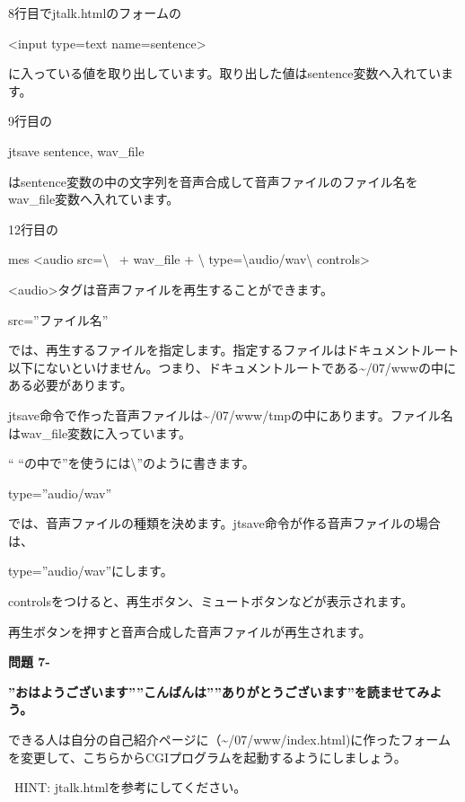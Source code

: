 \documentclass[a4paper,12pt,dvipdfmx]{jarticle}
\newcounter{Question}
\renewcommand\theQuestion{\textbf{問題 7-\arabic{Question}}}
\begin{document}
\bigskip

8行目でjtalk.htmlのフォームの

{\textless}input type={\textquotedbl}text{\textquotedbl} name={\textquotedbl}sentence{\textquotedbl}{\textgreater}

に入っている値を取り出しています。取り出した値はsentence変数へ入れています。

9行目の

jtsave sentence, wav\_file

はsentence変数の中の文字列を音声合成して音声ファイルのファイル名をwav\_file変数へ入れています。

12行目の

mes {\textquotedbl}{\textless}audio src={\textbackslash}{\textquotedbl}{\textquotedbl} \ + wav\_file +
{\textquotedbl}{\textbackslash}{\textquotedbl}
type={\textbackslash}{\textquotedbl}audio/wav{\textbackslash}{\textquotedbl} controls{\textgreater}{\textquotedbl}

	{\textless}audio{\textgreater}タグは音声ファイルを再生することができます。

src=”ファイル名”

では、再生するファイルを指定します。指定するファイルはドキュメントルート以下にないといけません。つまり、ドキュメントルートである{\textasciitilde}/07/wwwの中にある必要があります。

jtsave命令で作った音声ファイルは{\textasciitilde}/07/www/tmpの中にあります。ファイル名はwav\_file変数に入っています。

“
“の中で”を使うには{\textbackslash}”のように書きます。

type=”audio/wav”

では、音声ファイルの種類を決めます。jtsave命令が作る音声ファイルの場合は、

type=”audio/wav”にします。

controlsをつけると、再生ボタン、ミュートボタンなどが表示されます。

再生ボタンを押すと音声合成した音声ファイルが再生されます。

\clearpage
{}\theQuestion

{\bfseries
	”おはようございます””こんばんは””ありがとうございます”を読ませてみよう。}


\bigskip

できる人は自分の自己紹介ページに（{\textasciitilde}/07/www/index.html)に作ったフォームを変更して、こちらからCGIプログラムを起動するようにしましょう。

\ HINT: jtalk.htmlを参考にしてください。
\end{document}
